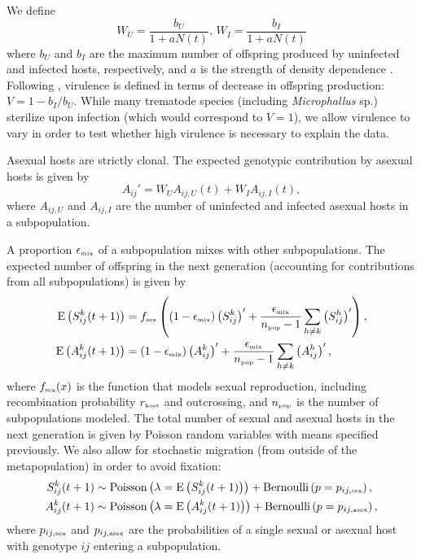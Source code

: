 \documentclass{article}\usepackage[]{graphicx}\usepackage[]{color}
\begin{document}
We define
$$
W_U = \frac{b_U}{1 + a N(t)},\,  W_I = \frac{b_I}{1 + a N(t)}
$$
where $b_U$ and $b_I$ are the maximum number of offspring produced by uninfected and infected hosts, respectively, and $a$ is the strength of density dependence \citep{smith1973stability, lively2010epidemiological}.
Following \cite{lively2010epidemiological}, virulence is defined in terms of decrease in offspring production: $V = 1- b_I/b_U$.
While many trematode species (including \textit{Microphallus} sp.) sterilize upon 
infection (which would correspond to $V = 1$), we allow virulence to vary
in order to test whether high virulence is necessary to explain the data.

Asexual hosts are strictly clonal.
The expected genotypic contribution by asexual hosts is given by
\begin{equation}
A_{ij}' = W_U A_{ij,U} (t) + W_I A_{ij,I} (t),
\end{equation}
where $A_{ij, U}$ and $A_{ij,I}$ are the number of uninfected and infected asexual hosts in a subpopulation.

A proportion $\epsilon_{\textrm{\tiny mix}}$ of a subpopulation mixes with other subpopulations.
The expected number of offspring in the next generation (accounting for contributions from all subpopulations) is given by
\begin{equation}
\begin{aligned}
\mathrm{E}\left(S_{ij}^k(t+1)\right) &= f_{\textrm{\tiny sex}}\left((1 - \epsilon_{\textrm{\tiny mix}}) \left(S_{ij}^k\right)' + \frac{\epsilon_{\textrm{\tiny mix}}}{n_{\textrm{\tiny pop}}-1} \sum_{h \neq k} \left(S_{ij}^h\right)'\right),\\
\mathrm{E}\left(A_{ij}^k(t+1)\right) &= (1 - \epsilon_{\textrm{\tiny mix}}) \left(A_{ij}^k\right)' + \frac{\epsilon_{\textrm{\tiny mix}}}{n_{\textrm{\tiny pop}}-1} \sum_{h \neq k} \left(A_{ij}^h\right)',\\
\end{aligned}
\end{equation}
where $f_{\textrm{\tiny sex}}(x)$ is the function that models sexual reproduction, including recombination probability $r_{\textrm{\tiny host}}$ and outcrossing, and $n_{\textrm{\tiny pop}}$ is the number of subpopulations modeled.
The total number of sexual and asexual hosts in the next generation is given by Poisson random variables with means specified previously. We also allow for stochastic migration (from outside of the metapopulation) in order to avoid fixation:
\begin{equation}
\begin{aligned}
S_{ij}^k(t+1) &\sim \mathrm{Poisson}\left(\lambda=\mathrm{E}\left(S_{ij}^k(t+1)\right)\right) + \mathrm{Bernoulli}\left(p=p_{ij,\textrm{\tiny sex}}\right),\\
A_{ij}^k(t+1) &\sim \mathrm{Poisson}\left(\lambda=\mathrm{E}\left(A_{ij}^k(t+1)\right)\right) + \mathrm{Bernoulli}\left(p=p_{ij, \textrm{\tiny asex}}\right),
\end{aligned}
\end{equation}
where $p_{ij,\textrm{\tiny sex}}$ and $p_{ij, \textrm{\tiny asex}}$ are the probabilities of a single sexual or asexual host with genotype $ij$ entering a subpopulation.
\end{document}
